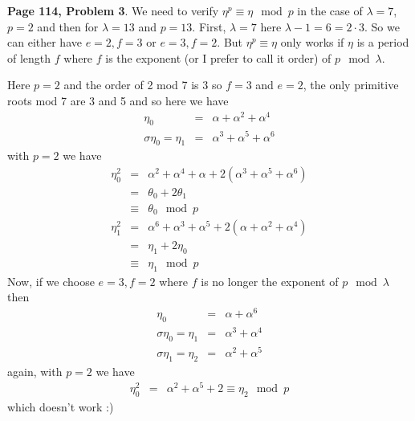 \documentclass[aps,preprint,preprintnumbers,nofootinbib,showpacs,prd]{revtex4-1}
\newcommand{\nbea}{\begin{eqnarray*}}
\newcommand{\neea}{\end{eqnarray*}}
\begin{document}
{\bf Page 114, Problem 3}. We need to verify $\eta^p \equiv \eta \mod{p}$ in the case of $\lambda = 7$, $p = 2$ and then for $\lambda = 13$ and $p = 13$. First, $\lambda = 7$ here $\lambda - 1 = 6 = 2\cdot 3$. So we can either have $e = 2, f = 3$ or $e = 3, f = 2$. But $\eta^p \equiv \eta$ only works if $\eta$ is a period of length $f$ where $f$ is the exponent (or I prefer to call it order) of $p \mod{\lambda}$.

Here $p=2$ and the order of 2 mod 7 is 3 so $f = 3$ and $e = 2$, the only primitive roots mod 7 are 3 and 5 and so here we have
%
\nbea
\eta_0 & = & \alpha + \alpha^{2} + \alpha^{4} \\
\sigma\eta_0 = \eta_1 & = & \alpha^3 + \alpha^5 + \alpha^6
\neea
%
with $p = 2$ we have
%
\nbea
\eta_0^2 & = & \alpha^2 + \alpha^4 + \alpha + 2(\alpha^3 + \alpha^5 + \alpha^6) \\
& = & \theta_0 + 2\theta_1 \\
& \equiv & \theta_0 \mod{p} \\
\eta_1^2 & = & \alpha^6 + \alpha^3 + \alpha^5 + 2(\alpha + \alpha^2 + \alpha^4) \\
& = & \eta_1 + 2\eta_0 \\
& \equiv & \eta_1 \mod{p}
\neea
%
Now, if we choose $e = 3, f = 2$ where $f$ is no longer the exponent of $p \mod{\lambda}$ then
%
\nbea
\eta_0 & = & \alpha + \alpha^{6} \\
\sigma\eta_0 = \eta_1 & = & \alpha^3 + \alpha^{4} \\
\sigma\eta_1 = \eta_2 & = & \alpha^{2} + \alpha^{5}
\neea
%
again, with $p=2$ we have
%
\nbea
\eta_0^2 & = & \alpha^2 + \alpha^5 + 2 \equiv \eta_2 \mod{p}
\neea
%
which doesn't work :)
\end{document}
